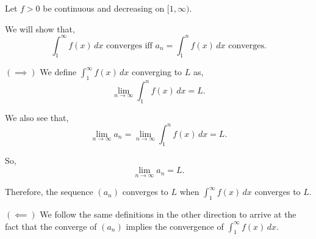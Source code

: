 \documentclass[../hw2]{subfiles}
\begin{document}
Let $f>0$ be continuous and decreasing on $[1,\infty)$.

We will show that, \[\int_{1}^{\infty}f(x)\,dx \text{ converges iff } a_n=\int_{1}^{n}f(x)\,dx \text{ converges.}\]

$(\implies)$ We define $\int_{1}^{\infty}f(x)\,dx$ converging to $L$ as, 
\[\lim\limits_{n\to\infty}\int_{1}^{n}f(x)\,dx=L.\]

We also see that,
\[\lim\limits_{n\to\infty}a_n=\lim\limits_{n\to\infty}\int_{1}^{n}f(x)\,dx=L.\]

So, \[\lim\limits_{n\to\infty}a_n=L.\]

Therefore, the sequence $(a_n)$ converges to $L$ when $\int_{1}^{\infty}f(x)\,dx$ converges to $L$.

$(\impliedby)$ We follow the same definitions in the other direction to arrive at the fact that the converge of $(a_n)$ implies the convergence of $\int_{1}^{\infty}f(x)\,dx$.
\end{document}
